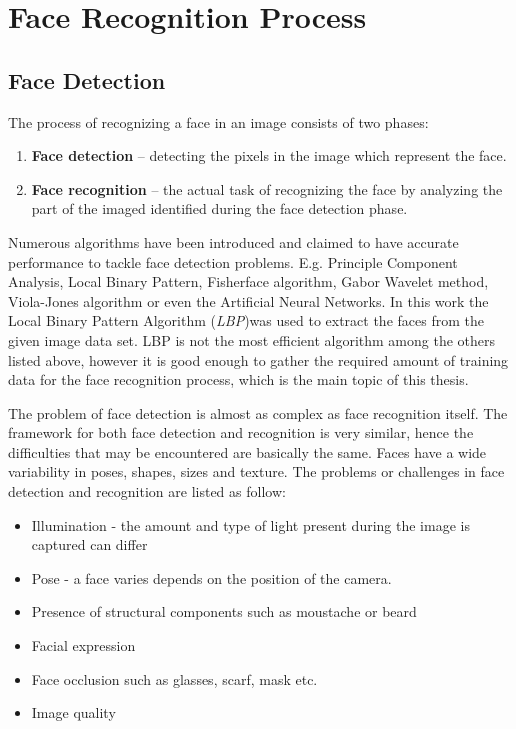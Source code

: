 
\chapter{Face Recognition Process}

\section{Face Detection}
The process of recognizing a face in an image consists of two phases:

\begin{enumerate}
\itemsep0em
\item \textbf{Face detection} – detecting the pixels in the image which represent the face. 
\item \textbf{Face recognition} – the actual task of recognizing the face by analyzing the part of the imaged identified during the face detection phase.
\end{enumerate}

Numerous algorithms have been introduced and claimed to have accurate performance to tackle face detection problems. E.g. Principle Component Analysis, Local Binary Pattern, Fisherface algorithm, Gabor Wavelet method, Viola-Jones algorithm or even the Artificial Neural Networks. In this work the Local Binary Pattern Algorithm (\textit{LBP})was used to extract the faces from the given image data set. LBP is not the most efficient algorithm among the others listed above, however it is good enough to gather the required amount of training data for the face recognition process, which is the main topic of this thesis. 

The problem of face detection is almost as complex as face recognition itself. The framework for both face detection and recognition is very similar, hence the difficulties that may be encountered are basically the same.
Faces have a wide variability in poses, shapes, sizes and texture. The problems or challenges in face detection and recognition are listed as follow:

\begin{itemize}
\itemsep0em
\item Illumination - the amount and type of light present during the image is captured can differ
\item Pose - a face varies depends on the position of the camera.
\item Presence of structural components such as moustache or beard
\item Facial expression 
\item Face occlusion such as glasses, scarf, mask etc.
\item Image quality 
\end{itemize}


